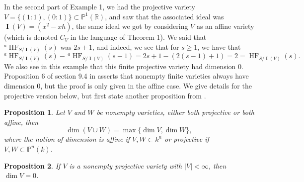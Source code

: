 \documentclass[11pt]{article}
\newcommand{\R}{\mathbb{R}}
\newcommand{\Proj}{\mathbb{P}}
\DeclareMathOperator{\HF}{HF}
\DeclareMathOperator{\I}{\mathbf{I}}
\newtheorem{proposition}{Proposition}
\theoremstyle{definition}
\begin{document}
In the second part of Example 1, we had the projective variety $V = \{(1:1), (0:1)\} \subset \Proj^1(\R)$, and saw that the associated ideal was $\I(V) = (x^2 - xh)$, the same ideal we got by considering $V$ as an affine variety (which is denoted $C_V$ in the language of Theorem 1). We said that $^a\HF_{S/\I(V)}(s)$ was $2s + 1$, and indeed, we see that for $s \geq 1$, we have that \[ ^a\HF_{S/\I(V)}(s) - \, ^a\HF_{S/\I(V)}(s - 1) = 2s + 1 - (2(s - 1) + 1) = 2 = \HF_{S/\I(V)}(s). \] We also see in this example that this finite projective variety had dimension 0. Proposition 6 of section 9.4 in \cite{cox2013ideals} asserts that nonempty finite varieties always have dimension 0, but the proof is only given in the affine case. We give details for the projective version below, but first state another proposition from \cite{cox2013ideals}.


\begin{proposition}
	Let $V$ and $W$ be nonempty varieties, either both projective or both affine, then \[ \dim (V \cup W) = \max\{\dim V, \dim W\}, \] where the notion of dimension is affine if $V,W \subset k^n$ or projective if $V,W \subset \Proj^n(k)$. 
\end{proposition}


\begin{proposition}
	If $V$ is a nonempty projective variety with $|V| < \infty$, then $\dim V = 0$. 
\end{proposition}
\end{document}
